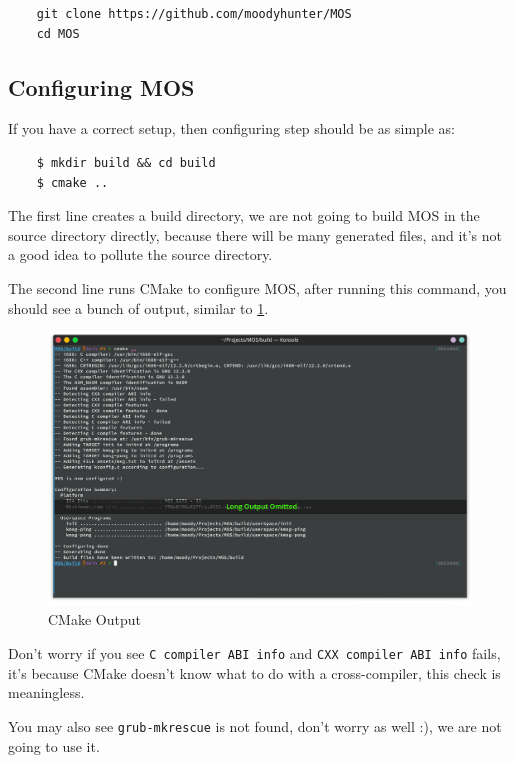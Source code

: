 \begin{verbatim}
    git clone https://github.com/moodyhunter/MOS
    cd MOS
\end{verbatim}

\subsection{Configuring MOS}

If you have a correct setup, then configuring step should be as simple as:

\begin{verbatim}
    $ mkdir build && cd build
    $ cmake ..
\end{verbatim}

The first line creates a build directory, we are not going to build MOS in the source directory
directly, because there will be many generated files, and it's not a good idea to pollute the
source directory.

The second line runs CMake to configure MOS, after running this command, you should see a
bunch of output, similar to \ref{fig:cmake-output}.

\begin{figure}[ht]
    \centering
    \includegraphics[width=\textwidth]{assets/c1.mos-cmake-configure.png}
    \caption{CMake Output}
    \label{fig:cmake-output}
\end{figure}

Don't worry if you see \texttt{C compiler ABI info} and \texttt{CXX compiler ABI info}
fails, it's because CMake doesn't know what to do with a cross-compiler, this check is meaningless.

You may also see \texttt{grub-mkrescue} is not found, don't worry as well :), we are not going to use it.

